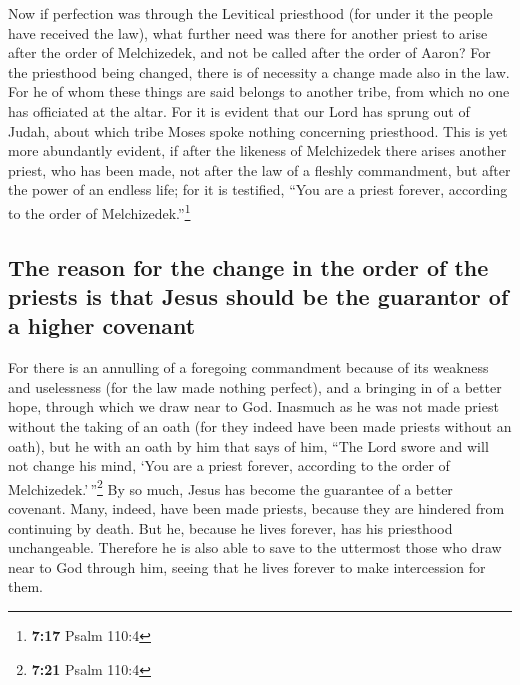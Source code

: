  Now if perfection was through the Levitical priesthood
(for under it the people have received the law), what further need was
there for another priest to arise after the order of Melchizedek, and
not be called after the order of Aaron?  For the
priesthood being changed, there is of necessity a change made also in
the law.  For he of whom these things are said belongs to
another tribe, from which no one has officiated at the altar.
 For it is evident that our Lord has sprung out of Judah,
about which tribe Moses spoke nothing concerning priesthood.
 This is yet more abundantly evident, if after the
likeness of Melchizedek there arises another priest,  who
has been made, not after the law of a fleshly commandment, but after the
power of an endless life;  for it is testified, ``You are
a priest forever, according to the order of Melchizedek.''\footnote{\textbf{7:17}
  Psalm 110:4}

\hypertarget{the-reason-for-the-change-in-the-order-of-the-priests-is-that-jesus-should-be-the-guarantor-of-a-higher-covenant}{%
\subsection{The reason for the change in the order of the priests is
that Jesus should be the guarantor of a higher
covenant}\label{the-reason-for-the-change-in-the-order-of-the-priests-is-that-jesus-should-be-the-guarantor-of-a-higher-covenant}}

 For there is an annulling of a foregoing commandment
because of its weakness and uselessness  (for the law
made nothing perfect), and a bringing in of a better hope, through which
we draw near to God.  Inasmuch as he was not made priest
without the taking of an oath  (for they indeed have been
made priests without an oath), but he with an oath by him that says of
him, ``The Lord swore and will not change his mind, `You are a priest
forever, according to the order of Melchizedek.'\,''\footnote{\textbf{7:21}
  Psalm 110:4}  By so much, Jesus has become the
guarantee of a better covenant.  Many, indeed, have been
made priests, because they are hindered from continuing by death.
 But he, because he lives forever, has his priesthood
unchangeable.  Therefore he is also able to save to the
uttermost those who draw near to God through him, seeing that he lives
forever to make intercession for them.

